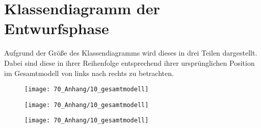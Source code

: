 \section{Klassendiagramm der Entwurfsphase}
\label{sec:anhang-klassendiagramm}

Aufgrund der Größe des Klassendiagramms wird dieses in drei Teilen dargestellt. Dabei sind diese in ihrer Reihenfolge entsprechend ihrer ursprünglichen Position im Gesamtmodell von links nach rechts zu betrachten.

\newcommand{\height}{16cm}

\begin{figure}
     \centering
     \texttt{[image: 70\_Anhang/10\_gesamtmodell]}
\end{figure}

\begin{figure}
     \centering
     \texttt{[image: 70\_Anhang/10\_gesamtmodell]}
\end{figure}

\begin{figure}
     \centering
     \texttt{[image: 70\_Anhang/10\_gesamtmodell]}
\end{figure}